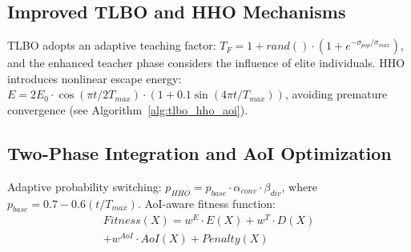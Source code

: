 \documentclass[conference]{IEEEtran}
\begin{document}
\subsection{Improved TLBO and HHO Mechanisms}
TLBO adopts an adaptive teaching factor: $T_F = 1 + rand() \cdot (1 + e^{-\sigma_{pop}/\sigma_{max}})$, and the enhanced teacher phase considers the influence of elite individuals. HHO introduces nonlinear escape energy: $E = 2E_0 \cdot \cos(\pi t/2T_{max}) \cdot (1 + 0.1 \sin(4\pi t/T_{max}))$, avoiding premature convergence (see Algorithm~\ref{alg:tlbo_hho_aoi}).

\subsection{Two-Phase Integration and AoI Optimization}
Adaptive probability switching: $p_{HHO} = p_{base} \cdot \alpha_{conv} \cdot \beta_{div}$, where $p_{base} = 0.7 - 0.6(t/T_{max})$. AoI-aware fitness function:
\begin{equation}
    \begin{split}
        Fitness(X) = w^E \cdot E(X) + w^T \cdot D(X) \\ 
        + w^{AoI} \cdot AoI(X) + Penalty(X)
    \end{split}
\end{equation}
\end{document}
